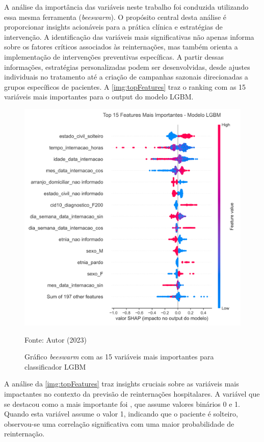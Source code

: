 A análise da importância das variáveis neste trabalho foi conduzida utilizando essa mesma ferramenta (\textit{beeswarm}). O propósito central desta análise é proporcionar insights acionáveis para a prática clínica e estratégias de intervenção. A identificação das variáveis mais significativas não apenas informa sobre os fatores críticos associados às reinternações, mas também orienta a implementação de intervenções preventivas específicas. A partir dessas informações, estratégias personalizadas podem ser desenvolvidas, desde ajustes individuais no tratamento até a criação de campanhas sazonais direcionadas a grupos específicos de pacientes. A \autoref{img:topFeatures} traz o ranking com as 15 variáveis mais importantes para o output do modelo LGBM.

\begin{figure}[H]
	\centering
	\caption{\label{img:topFeatures}Gráfico \textit{beeswarm} com as 15 variáveis mais importantes para classificador LGBM}
	\includegraphics[scale=0.7]{USPSC-img/top-features-lgbm.png}
	\begin{center}
		Fonte: Autor (2023)
	\end{center}
\end{figure}

A análise da \autoref{img:topFeatures} traz insights cruciais sobre as variáveis mais impactantes no contexto da previsão de reinternações hospitalares. A variável que se destacou como a mais importante foi , que assume valores binários 0 e 1. Quando esta variável assume o valor 1, indicando que o paciente é solteiro, observou-se uma correlação significativa com uma maior probabilidade de reinternação.

